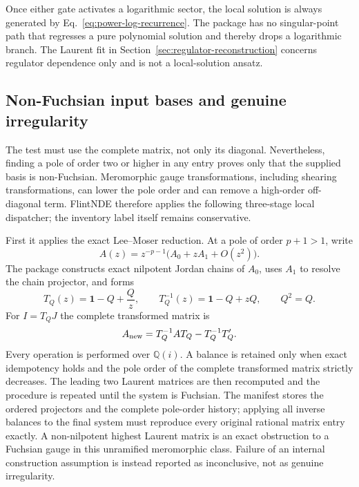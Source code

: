 \documentclass[11pt]{article}
\newcommand{\Id}{\mathbf 1}
\begin{document}
 Once either gate activates a logarithmic sector, the local solution is always generated by
Eq.~\eqref{eq:power-log-recurrence}.  The package has no singular-point path that regresses a
pure polynomial solution and thereby drops a logarithmic branch.  The Laurent fit in
Section~\ref{sec:regulator-reconstruction} concerns regulator dependence only and is not a
local-solution ansatz.

\subsection{Non-Fuchsian input bases and genuine irregularity}
\label{subsec:nonfuchsian}

The test must use the complete matrix, not only its diagonal.  Nevertheless, finding a pole
of order two or higher in any entry proves only that the supplied basis is non-Fuchsian.
Meromorphic gauge transformations, including shearing transformations, can lower the pole
order and can remove a high-order off-diagonal term.  FlintNDE therefore applies the
following three-stage local dispatcher; the inventory label itself remains conservative.

First it applies the exact Lee--Moser reduction.  At a pole of order $p+1>1$, write
\begin{equation}
 A(z)=z^{-p-1}\bigl(A_0+zA_1+O(z^2)\bigr).
\end{equation}
The package constructs exact nilpotent Jordan chains of $A_0$, uses $A_1$ to resolve the
chain projector, and forms
\begin{equation}
 T_Q(z)=\Id-Q+\frac{Q}{z},\qquad
 T_Q^{-1}(z)=\Id-Q+zQ,\qquad Q^2=Q.
 \label{eq:moser-balance}
\end{equation}
For $I=T_QJ$ the complete transformed matrix is
\begin{equation}
 A_{\rm new}=T_Q^{-1}A T_Q-T_Q^{-1}T_Q'.
 \label{eq:moser-transformed-system}
\end{equation}
Every operation is performed over $\mathbb Q(i)$.  A balance is retained only when exact
idempotency holds and the pole order of the complete transformed matrix strictly decreases.
The leading two Laurent matrices are then recomputed and the procedure is repeated until the
system is Fuchsian.  The manifest stores the ordered projectors and the complete pole-order
history; applying all inverse balances to the final system must reproduce every original
rational matrix entry exactly.  A non-nilpotent highest Laurent matrix is an exact obstruction
to a Fuchsian gauge in this unramified meromorphic class.  Failure of an internal construction
assumption is instead reported as inconclusive, not as genuine irregularity.
\end{document}
